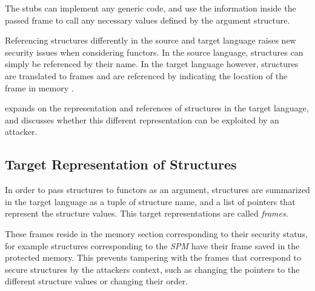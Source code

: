 The stubs can implement any generic code, and use the information inside the passed frame to call any necessary values defined by the argument structure.

\smallskip

Referencing structures differently in the source and target language raises new security issues when considering functors.
In the source language, structures can simply be referenced by their name.
In the target language however, structures are translated to frames and are referenced by indicating the location of the frame in memory .


 expands on the representation and references of structures in the target language, and discusses whether this different representation can be exploited by an attacker.

\subsection{Target Representation of Structures}
\label{sec:LowLevelRepresentation}
In order to pass structures to functors as an argument, structures are summarized in the target language as a tuple of structure name, and a list of pointers that represent the structure values.
This target representations are called \emph{frames}.

These frames reside in the memory section corresponding to their security status, for example
structures corresponding to the \emph{SPM} have their frame saved in the protected memory.
This prevents tampering with the frames that correspond to secure structures by the attackers context, such as changing the pointers to the different structure values or changing their order.


